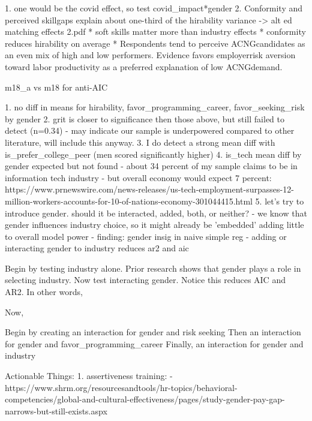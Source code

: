 \documentclass[review]{elsarticle}
\begin{document}
1. one would be the covid effect, so test covid_impact*gender
2.  Conformity  and  perceived  skillgaps  explain  about  one-third  of  the  hirability  variance -> alt ed matching effects 2.pdf
    * soft skills matter more than industry effects
    * conformity reduces hirability on average
    * Respondents tend to perceive ACNGcandidates as an even mix of high and low performers.  Evidence favors employerrisk aversion toward labor productivity as a preferred explanation of low ACNGdemand.

m18_a vs m18 for anti-AIC


1. no diff in means for hirability, favor_programming_career, favor_seeking_risk by gender
2. grit is closer to significance then those above, but still failed to detect (n=0.34)
    - may indicate our sample is underpowered compared to other literature, will include this anyway.
3. I do detect a strong mean diff with is_prefer_college_peer (men scored significantly higher)
4. is_tech mean diff by gender expected but not found
    - about 34 percent of my sample claims to be in information tech industry
    - but overall economy would expect 7 percent: https://www.prnewswire.com/news-releases/us-tech-employment-surpasses-12-million-workers-accounts-for-10-of-nations-economy-301044415.html
5. let's try to introduce gender. should it be interacted, added, both, or neither?
    - we know that gender influences industry choice, so it might already be 'embedded' adding little to overall model power
    - finding: gender insig in naive simple reg
    - adding or interacting gender to industry reduces ar2 and aic






Begin by testing industry alone. Prior research shows that gender plays a role in selecting industry.
Now test interacting gender. Notice this reduces AIC and AR2. In other words,

Now,

Begin by creating an interaction for gender and risk seeking
Then an interaction for gender and favor_programming_career
Finally, an interaction for gender and industry


Actionable Things:
1.  assertiveness training:
 - https://www.shrm.org/resourcesandtools/hr-topics/behavioral-competencies/global-and-cultural-effectiveness/pages/study-gender-pay-gap-narrows-but-still-exists.aspx
\end{document}
